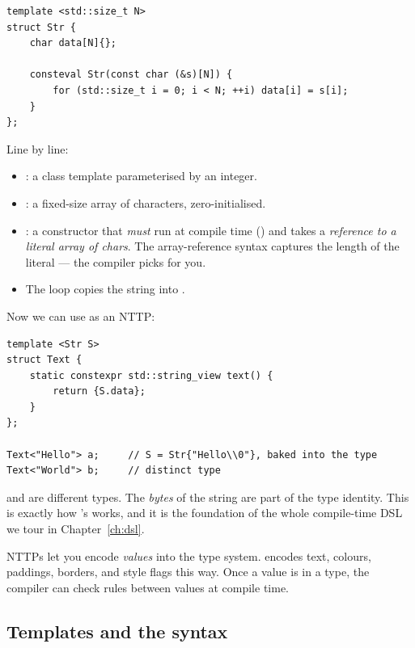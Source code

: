 \begin{lstlisting}
template <std::size_t N>
struct Str {
    char data[N]{};

    consteval Str(const char (&s)[N]) {
        for (std::size_t i = 0; i < N; ++i) data[i] = s[i];
    }
};
\end{lstlisting}

Line by line:

\begin{itemize}[leftmargin=*]
  \item {}: a class template
    parameterised by an integer.
  \item {}: a fixed-size array of 
    characters, zero-initialised.
  \item {}: a constructor that
    \emph{must} run at compile time () and takes a
    \emph{reference to a literal array of  chars}. The
    array-reference syntax  captures the length of
    the literal --- the compiler picks  for you.
  \item The loop copies the string into .
\end{itemize}

Now we can use  as an NTTP:

\begin{lstlisting}
template <Str S>
struct Text {
    static constexpr std::string_view text() {
        return {S.data};
    }
};

Text<"Hello"> a;     // S = Str{"Hello\\0"}, baked into the type
Text<"World"> b;     // distinct type
\end{lstlisting}

 and  are different types.
The \emph{bytes} of the string are part of the type identity. This
is exactly how \maya{}'s  works, and it is the
foundation of the whole compile-time DSL we tour in
Chapter~\ref{ch:dsl}.

\begin{idea}
NTTPs let you encode \emph{values} into the type system. \maya{}
encodes text, colours, paddings, borders, and style flags this way.
Once a value is in a type, the compiler can check rules between
values at compile time.
\end{idea}

\subsection{Templates and the \code{<>} syntax}

